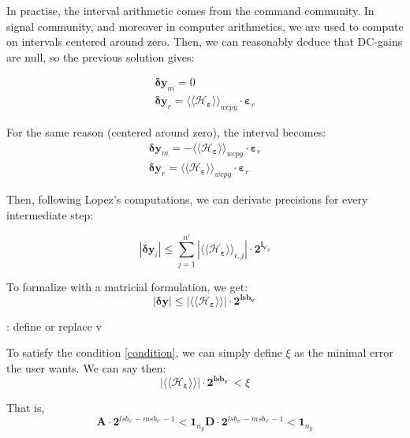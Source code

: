 		In practise, the interval arithmetic comes from the command community.
		In signal community, and moreover in computer arithmetics, we are used to compute on intervals centered around zero.
		Then, we can reasonably deduce that DC-gains are null, so the previous solution gives:

		\begin{eqnarray} \label{eqprec}
			\boldsymbol{\delta y}_m = 0 \\
			\boldsymbol{\delta y}_r = \langle\langle \mathcal{H}_{\boldsymbol{\varepsilon}} \rangle\rangle_{wcpg} \cdot \boldsymbol{\varepsilon}_r
		\end{eqnarray}

		For the same reason (centered around zero), the interval becomes:
		\begin{eqnarray} \label{eqprec}
			\boldsymbol{\delta y}_m = -\langle\langle \mathcal{H}_{\boldsymbol{\varepsilon}} \rangle\rangle_{wcpg} \cdot \boldsymbol{\varepsilon}_r \\
			\boldsymbol{\delta y}_r = \langle\langle \mathcal{H}_{\boldsymbol{\varepsilon}} \rangle\rangle_{wcpg} \cdot \boldsymbol{\varepsilon}_r
		\end{eqnarray}

		Then, following Lopez's computations, we can derivate precisions for every intermediate step:
		
		\begin{equation}
			|\boldsymbol{\delta y}_i| \leq \sum_{j=1}^{n'} | \langle\langle \mathcal{H}_{\boldsymbol{\varepsilon}} \rangle\rangle_{i,j}| \cdot \boldsymbol{2^{l_{v'_j}}}
		\end{equation}

		To formalize with a matricial formulation, we get:
		\begin{equation}
			|\boldsymbol{\delta y}| \leq | \langle\langle \mathcal{H}_{\boldsymbol{\varepsilon}} \rangle\rangle| \cdot \boldsymbol{2^{lsb_{v'}}}
		\end{equation}

		\TODO: define or replace v

		To satisfy the condition \ref{condition}, we can simply define $\xi$ as the minimal error the user wants.
		We can say then:
		\begin{equation}
			| \langle\langle \mathcal{H}_{\boldsymbol{\varepsilon}} \rangle\rangle| \cdot \boldsymbol{2^{lsb_{v'}}} < \xi
		\end{equation}

		That is, 
		\begin{equation}
			\boldsymbol{A} \cdot \boldsymbol{2}^{lsb_{v'}-msb_{v'}-1} < \boldsymbol{1}_{n_y}
			\boldsymbol{D} \cdot \boldsymbol{2}^{lsb_{v'}-msb_{v'}-1} < \boldsymbol{1}_{n_y}
		\end{equation}

